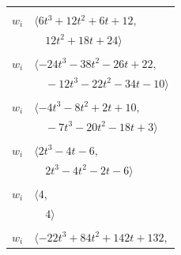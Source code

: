 \documentclass[11pt]{article}
\begin{document}
\begin{longtable}{@{}ll@{}}
\addlinespace[2pt]
\multicolumn{2}{@{}p{0.97\textwidth}@{}}{$i=35$, $D_i=1$, $\rho_{ij}$: $3{:}2, \allowbreak 5{:}2, \allowbreak 10{:}1, \allowbreak 12{:}1, \allowbreak 21{:}2, \allowbreak 33{:}2, \allowbreak 38{:}2, \allowbreak 40{:}1$}\\
$w_i$ & $\langle 6t^{3}+12t^{2}+6t+12,$\\
 & $\quad 12t^{2}+18t+24\rangle$\\
\addlinespace[2pt]
\multicolumn{2}{@{}p{0.97\textwidth}@{}}{$i=36$, $D_i=1$, $\rho_{ij}$: $1{:}2, \allowbreak 3{:}2, \allowbreak 4{:}2, \allowbreak 5{:}2, \allowbreak 14{:}2, \allowbreak 18{:}2, \allowbreak 24{:}2, \allowbreak 30{:}2, \allowbreak 34{:}1$}\\
$w_i$ & $\langle -24t^{3}-38t^{2}-26t+22,$\\
 & $\quad -12t^{3}-22t^{2}-34t-10\rangle$\\
\addlinespace[2pt]
\multicolumn{2}{@{}p{0.97\textwidth}@{}}{$i=37$, $D_i=1$, $\rho_{ij}$: $2{:}2, \allowbreak 3{:}2, \allowbreak 7{:}2, \allowbreak 8{:}1, \allowbreak 12{:}2, \allowbreak 18{:}1, \allowbreak 20{:}2, \allowbreak 22{:}2, \allowbreak 29{:}1$}\\
$w_i$ & $\langle -4t^{3}-8t^{2}+2t+10,$\\
 & $\quad -7t^{3}-20t^{2}-18t+3\rangle$\\
\addlinespace[2pt]
\multicolumn{2}{@{}p{0.97\textwidth}@{}}{$i=38$, $D_i=1$, $\rho_{ij}$: $2{:}1, \allowbreak 5{:}1, \allowbreak 10{:}1, \allowbreak 12{:}2, \allowbreak 14{:}1, \allowbreak 20{:}1, \allowbreak 21{:}2, \allowbreak 35{:}1$}\\
$w_i$ & $\langle 2t^{3}-4t-6,$\\
 & $\quad 2t^{3}-4t^{2}-2t-6\rangle$\\
\addlinespace[2pt]
\multicolumn{2}{@{}p{0.97\textwidth}@{}}{$i=39$, $D_i=1$, $\rho_{ij}$: $4{:}1, \allowbreak 15{:}2, \allowbreak 22{:}1, \allowbreak 24{:}1, \allowbreak 25{:}2, \allowbreak 28{:}1, \allowbreak 34{:}2$}\\
$w_i$ & $\langle 4,$\\
 & $\quad 4\rangle$\\
\addlinespace[2pt]
\multicolumn{2}{@{}p{0.97\textwidth}@{}}{$i=40$, $D_i=1$, $\rho_{ij}$: $1{:}1, \allowbreak 2{:}2, \allowbreak 3{:}2, \allowbreak 6{:}2, \allowbreak 11{:}1, \allowbreak 12{:}2, \allowbreak 13{:}2, \allowbreak 18{:}1, \allowbreak 22{:}2, \allowbreak 23{:}2, \allowbreak 24{:}2, \allowbreak 35{:}2$}\\
$w_i$ & $\langle -22t^{3}+84t^{2}+142t+132,$\\

\end{longtable}
\end{document}
